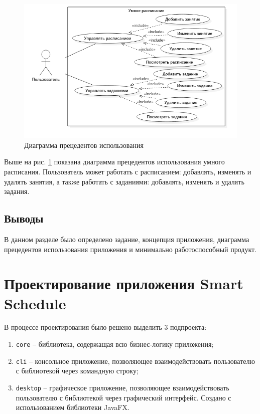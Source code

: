 \begin{figure}[H]
	\begin{center}
		\includegraphics[scale=0.8]{pics/usecase}
		\caption{Диаграмма прецедентов использования} 
		\label{pic:use_case_diagram} %
	\end{center}
\end{figure}

Выше на рис. \ref{pic:use_case_diagram} показана диаграмма прецедентов использования умного расписания. Пользователь может работать с расписанием: добавлять, изменять и удалять занятия, а также работать с заданиями: добавлять, изменять и удалять задания.

\subsection{Выводы}
В данном разделе было определено задание, концепция приложения, диаграмма прецедентов использования приложения и минимально работоспособный продукт.

\section{Проектирование приложения Smart Schedule}

В процессе проектирования было решено выделить 3 подпроекта:
\begin{enumerate}
\item \texttt{core} -- библиотека, содержащая всю бизнес-логику приложения;
\item \texttt{cli} -- консольное приложение, позволяющее взаимодействовать пользователю с библиотекой через командную строку;
\item \texttt{desktop} -- графическое приложение, позволяющее взаимодействовать пользователю с библиотекой через графический интерфейс. Создано с использованием библиотеки JavaFX.
\end{enumerate}

